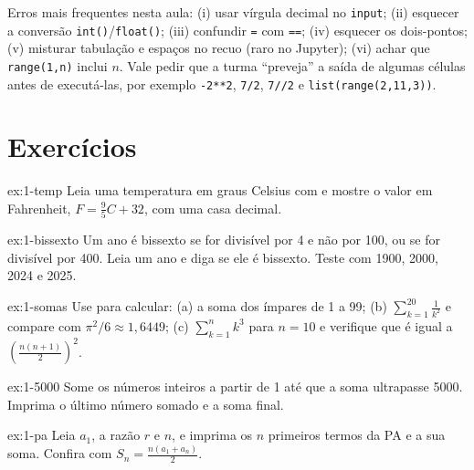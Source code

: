 {{\begin{professor}
Erros mais frequentes nesta aula: (i) usar vírgula decimal no \texttt{input}; (ii) esquecer a conversão
\texttt{int()}/\texttt{float()}; (iii) confundir \texttt{=} com \texttt{==}; (iv) esquecer os dois-pontos;
(v) misturar tabulação e espaços no recuo (raro no Jupyter); (vi) achar que \texttt{range(1,n)} inclui $n$.
Vale pedir que a turma ``preveja'' a saída de algumas células antes de executá-las, por exemplo
\texttt{-2**2}, \texttt{7/2}, \texttt{7//2} e \texttt{list(range(2,11,3))}.
\end{professor}

\section{Exercícios}

\begin{exercicio}{ex:1-temp}
Leia uma temperatura em graus Celsius com  e mostre o valor em Fahrenheit, $F = \frac{9}{5}C+32$,
com uma casa decimal.
\end{exercicio}

\begin{exercicio}{ex:1-bissexto}
Um ano é bissexto se for divisível por 4 e não por 100, ou se for divisível por 400. Leia um ano e diga se ele é
bissexto. Teste com 1900, 2000, 2024 e 2025.
\end{exercicio}

\begin{exercicio}[somatórios]{ex:1-somas}
Use  para calcular:
(a) a soma dos ímpares de 1 a 99; (b) $\displaystyle\sum_{k=1}^{20}\frac{1}{k^2}$ e compare com $\pi^2/6\approx 1{,}6449$;
(c) $\displaystyle\sum_{k=1}^{n} k^3$ para $n=10$ e verifique que é igual a $\left(\frac{n(n+1)}{2}\right)^2$.
\end{exercicio}

\begin{exercicio}{ex:1-5000}
Some os números inteiros a partir de 1 até que a soma ultrapasse 5000. Imprima o último número somado e a soma final.
\end{exercicio}

\begin{exercicio}{ex:1-pa}
Leia $a_1$, a razão $r$ e $n$, e imprima os $n$ primeiros termos da PA e a sua soma. Confira com
$S_n = \frac{n(a_1+a_n)}{2}$.
\end{exercicio}

}}

